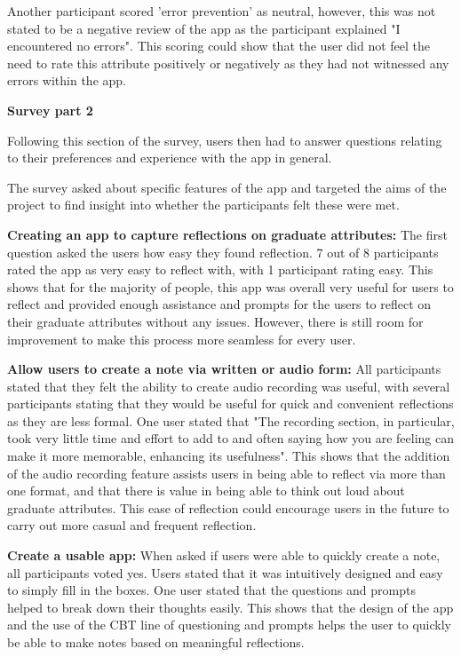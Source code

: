 \documentclass{l4proj}
\begin{document}
Another participant scored 'error prevention' as neutral, however, this was not stated to be a negative review of the app as the participant explained "I encountered no errors". This scoring could show that the user did not feel the need to rate this attribute positively or negatively as they had not witnessed any errors within the app.

\textbf{Survey part 2}
 
Following this section of the survey, users then had to answer questions relating to their preferences and experience with the app in general. 

The survey asked about specific features of the app and targeted the aims of the project to find insight into whether the participants felt these were met.
 
\textbf{Creating an app to capture reflections on graduate attributes:} The first question asked the users how easy they found reflection. 7 out of 8 participants rated the app as very easy to reflect with, with 1 participant rating easy. This shows that for the majority of people, this app was overall very useful for users to reflect and provided enough assistance and prompts for the users to reflect on their graduate attributes without any issues. However, there is still room for improvement to make this process more seamless for every user.

\textbf{Allow users to create a note via written or audio form:} All participants stated that they felt the ability to create audio recording was useful, with several participants stating that they would be useful for quick and convenient reflections as they are less formal. One user stated that "The recording section, in particular, took very little time and effort to add to and often saying how you are feeling can make it more memorable, enhancing its usefulness". This shows that the addition of the audio recording feature assists users in being able to reflect via more than one format, and that there is value in being able to think out loud about graduate attributes. This ease of reflection could encourage users in the future to carry out more casual and frequent reflection. 

\textbf{Create a usable app:} When asked if users were able to quickly create a note, all participants voted yes. Users stated that it was intuitively designed and easy to simply fill in the boxes. One user stated that the questions and prompts helped to break down their thoughts easily. This shows that the design of the app and the use of the CBT line of questioning and prompts helps the user to quickly be able to make notes based on meaningful reflections.
\end{document}
